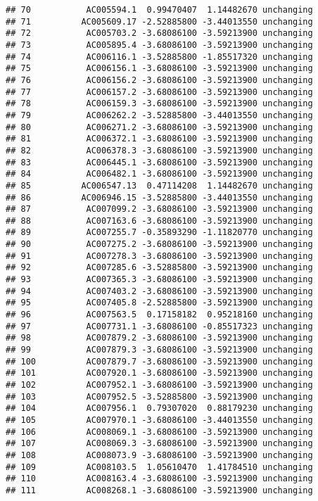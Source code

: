 \documentclass[]{article}
\begin{document}
\begin{verbatim}
## 70           AC005594.1  0.99470407  1.14482670 unchanging
## 71          AC005609.17 -2.52885800 -3.44013550 unchanging
## 72           AC005703.2 -3.68086100 -3.59213900 unchanging
## 73           AC005895.4 -3.68086100 -3.59213900 unchanging
## 74           AC006116.1 -3.52885800 -1.85517320 unchanging
## 75           AC006156.1 -3.68086100 -3.59213900 unchanging
## 76           AC006156.2 -3.68086100 -3.59213900 unchanging
## 77           AC006157.2 -3.68086100 -3.59213900 unchanging
## 78           AC006159.3 -3.68086100 -3.59213900 unchanging
## 79           AC006262.2 -3.52885800 -3.44013550 unchanging
## 80           AC006271.2 -3.68086100 -3.59213900 unchanging
## 81           AC006372.1 -3.68086100 -3.59213900 unchanging
## 82           AC006378.3 -3.68086100 -3.59213900 unchanging
## 83           AC006445.1 -3.68086100 -3.59213900 unchanging
## 84           AC006482.1 -3.68086100 -3.59213900 unchanging
## 85          AC006547.13  0.47114208  1.14482670 unchanging
## 86          AC006946.15 -3.52885800 -3.44013550 unchanging
## 87           AC007099.2 -3.68086100 -3.59213900 unchanging
## 88           AC007163.6 -3.68086100 -3.59213900 unchanging
## 89           AC007255.7 -0.35893290 -1.11820770 unchanging
## 90           AC007275.2 -3.68086100 -3.59213900 unchanging
## 91           AC007278.3 -3.68086100 -3.59213900 unchanging
## 92           AC007285.6 -3.52885800 -3.59213900 unchanging
## 93           AC007365.3 -3.68086100 -3.59213900 unchanging
## 94           AC007403.2 -3.68086100 -3.59213900 unchanging
## 95           AC007405.8 -2.52885800 -3.59213900 unchanging
## 96           AC007563.5  0.17158182  0.95218160 unchanging
## 97           AC007731.1 -3.68086100 -0.85517323 unchanging
## 98           AC007879.2 -3.68086100 -3.59213900 unchanging
## 99           AC007879.3 -3.68086100 -3.59213900 unchanging
## 100          AC007879.7 -3.68086100 -3.59213900 unchanging
## 101          AC007920.1 -3.68086100 -3.59213900 unchanging
## 102          AC007952.1 -3.68086100 -3.59213900 unchanging
## 103          AC007952.5 -3.52885800 -3.59213900 unchanging
## 104          AC007956.1  0.79307020  0.88179230 unchanging
## 105          AC007970.1 -3.68086100 -3.44013550 unchanging
## 106          AC008069.1 -3.68086100 -3.59213900 unchanging
## 107          AC008069.3 -3.68086100 -3.59213900 unchanging
## 108          AC008073.9 -3.68086100 -3.59213900 unchanging
## 109          AC008103.5  1.05610470  1.41784510 unchanging
## 110          AC008163.4 -3.68086100 -3.59213900 unchanging
## 111          AC008268.1 -3.68086100 -3.59213900 unchanging

\end{verbatim}
\end{document}

